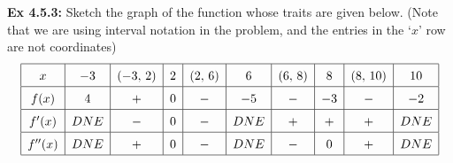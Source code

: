 \begin{tcolorbox}[example]
    \textbf{Ex 4.5.3: } Sketch the graph of the function whose traits are given below. (Note that we are using interval notation in the problem, and the entries in the `$x$' row are not coordinates) \begin{align*}
        \arraycolsep=5.5pt\def\arraystretch{1.5}
        \begin{array}{|c|c|c|c|c|c|c|c|c|c|}
            \hline
            x & -3 & (-3, \, 2) & 2 & (2, \, 6) & 6 & (6, \, 8) & 8 & (8, \, 10) & 10 \\ \hline
            f(x) & 4 & + & 0 & - & -5 & - & -3 & - & -2 \\ \hline
            f'(x) & DNE & - & 0 & - & DNE & + & + & + & DNE \\ \hline
            f''(x) & DNE & + & 0 & - & DNE & - & 0 & + & DNE \\
            \hline
        \end{array}
    \end{align*}
\end{tcolorbox} 
